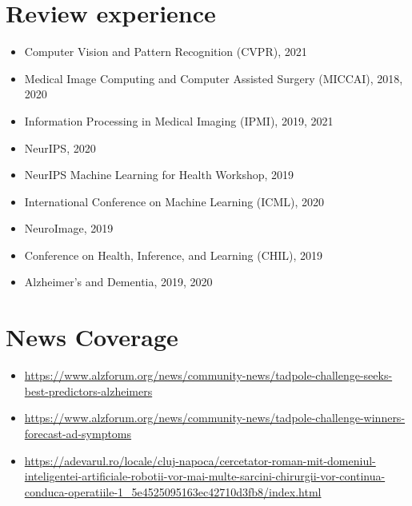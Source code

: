 \documentclass[a4paper,10pt]{article} %
\begin{document}
\section*{Review experience}
\begin{itemize}
 \item Computer Vision and Pattern Recognition (CVPR), 2021
 \item Medical Image Computing and Computer Assisted Surgery (MICCAI), 2018, 2020
 \item Information Processing in Medical Imaging (IPMI), 2019, 2021
 \item NeurIPS, 2020
 \item NeurIPS Machine Learning for Health Workshop, 2019
 \item International Conference on Machine Learning (ICML), 2020
 \item NeuroImage, 2019
 \item Conference on Health, Inference, and Learning (CHIL), 2019
 \item Alzheimer's and Dementia, 2019, 2020

\end{itemize}


\section*{News Coverage}
\begin{itemize}
 \item \url{https://www.alzforum.org/news/community-news/tadpole-challenge-seeks-best-predictors-alzheimers}
 \item \url{https://www.alzforum.org/news/community-news/tadpole-challenge-winners-forecast-ad-symptoms}
 \item \url{https://adevarul.ro/locale/cluj-napoca/cercetator-roman-mit-domeniul-inteligentei-artificiale-robotii-vor-mai-multe-sarcini-chirurgii-vor-continua-conduca-operatiile-1_5e4525095163ec42710d3fb8/index.html}
\end{itemize}
\end{document}
